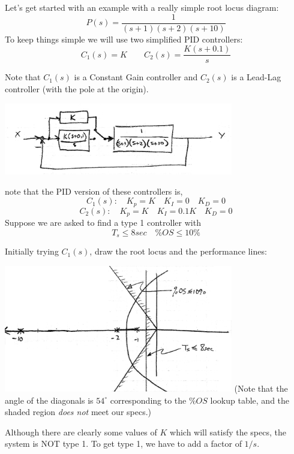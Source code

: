 \begin{Example}
Let's get started with an example with a really simple root locus diagram:
\[
P(s) = \frac  {1}   {(s+1)(s+2)(s+10)}
\]
To keep things simple we will use two simplified PID controllers:
\[
C_1(s) = K \qquad   C_2(s) = \frac   {K(s+0.1)} {s}
\]

Note that $C_1(s)$ is a Constant Gain controller and $C_2(s)$ is
a Lead-Lag controller (with the pole at the origin).


\includegraphics[width=100mm]{figs09/01107.png}

note that the PID version of these controllers is,
\[
C_1(s):  \quad K_p = K \quad K_I = 0 \quad K_D = 0
\]
\[
C_2(s):  \quad K_p = K \quad K_I = 0.1K \quad K_D = 0
\]
Suppose we are asked  to find a type 1 controller with
\[
T_s \leq 8sec \quad \%OS \leq 10\%
\]

Initially trying $C_1(s)$, draw the root locus and the performance lines:

\includegraphics[width=100mm]{figs09/01108.png}
(Note that the angle of the diagonals is $54^\circ$ corresponding to the $\%OS$ lookup table, and the
shaded region {\it does not} meet our specs.)

Although   there are clearly some values of $K$ which will satisfy the specs, the system is NOT type 1.
To get type 1, we have to add a factor of $1/s$.
\end{Example}
